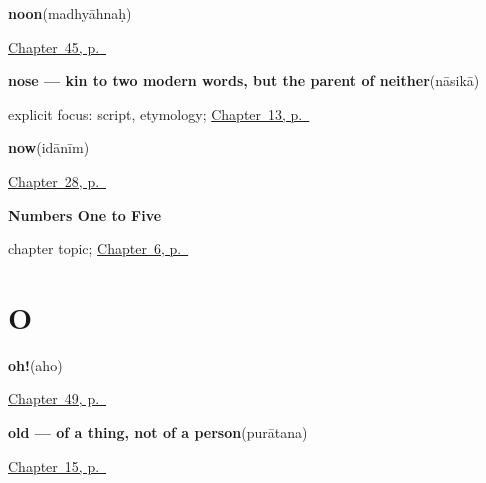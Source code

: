 \noindent\begin{minipage}[t]{\linewidth}
\raggedright
\textbf{noon}\enspace\emph{}\enspace(madhyāhnaḥ)\par
\footnotesize \hyperref[ch:sa-times-of-the-day]{Chapter~45, p.~\pageref*{ch:sa-times-of-the-day}}
\end{minipage}\par\smallskip

\noindent\begin{minipage}[t]{\linewidth}
\raggedright
\textbf{nose — kin to two modern words, but the parent of neither}\enspace\emph{}\enspace(nāsikā)\par
\footnotesize explicit focus: script, etymology; \hyperref[ch:sa-face-nouns-2]{Chapter~13, p.~\pageref*{ch:sa-face-nouns-2}}
\end{minipage}\par\smallskip

\noindent\begin{minipage}[t]{\linewidth}
\raggedright
\textbf{now}\enspace\emph{}\enspace(idānīm)\par
\footnotesize \hyperref[ch:sa-leave-more]{Chapter~28, p.~\pageref*{ch:sa-leave-more}}
\end{minipage}\par\smallskip

\noindent\begin{minipage}[t]{\linewidth}
\raggedright
\textbf{Numbers One to Five}\par
\footnotesize chapter topic; \hyperref[ch:numbers-one-to-five]{Chapter~6, p.~\pageref*{ch:numbers-one-to-five}}
\end{minipage}\par\smallskip

\section*{O}

\noindent\begin{minipage}[t]{\linewidth}
\raggedright
\textbf{oh!}\enspace\emph{}\enspace(aho)\par
\footnotesize \hyperref[ch:sa-small-answers]{Chapter~49, p.~\pageref*{ch:sa-small-answers}}
\end{minipage}\par\smallskip

\noindent\begin{minipage}[t]{\linewidth}
\raggedright
\textbf{old — of a thing, not of a person}\enspace\emph{}\enspace(purātana)\par
\footnotesize \hyperref[ch:sa-describing-things]{Chapter~15, p.~\pageref*{ch:sa-describing-things}}
\end{minipage}\par\smallskip

